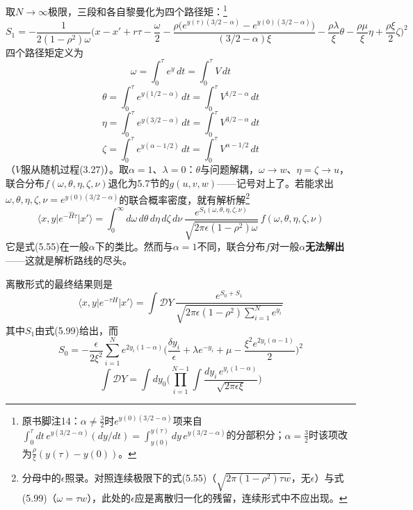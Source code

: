 取$N\to\infty$极限，三段和各自黎曼化为四个路径矩：\footnote{原书脚注14：$\alpha\neq\frac{3}{2}$时$e^{y(0)(3/2-\alpha)}$项来自$\int_0^{\tau}dt\,e^{y(3/2-\alpha)}(dy/dt)=\int_{y(0)}^{y(\tau)}dy\,e^{y(3/2-\alpha)}$的分部积分；$\alpha=\frac{3}{2}$时该项改为$\frac{\rho}{\xi}(y(\tau)-y(0))$。}
\begin{equation*}
S_{1}=-\frac{1}{2(1-\rho^{2})\omega}\biggl(x-x'+r\tau-\frac{\omega}{2}
-\frac{\rho\bigl(e^{y(\tau)(3/2-\alpha)}-e^{y(0)(3/2-\alpha)}\bigr)}{(3/2-\alpha)\xi}
-\frac{\rho\lambda}{\xi}\theta-\frac{\rho\mu}{\xi}\eta+\frac{\rho\xi}{2}\zeta\biggr)^{2}
\tag{5.99}
\end{equation*}四个路径矩定义为
\begin{equation*}
\omega=\int_{0}^{\tau}e^{y}\,dt=\int_{0}^{\tau}V\,dt
\tag{5.100}
\end{equation*}
\begin{equation*}
\theta=\int_{0}^{\tau}e^{y(1/2-\alpha)}\,dt=\int_{0}^{\tau}V^{1/2-\alpha}\,dt
\tag{5.101}
\end{equation*}
\begin{equation*}
\eta=\int_{0}^{\tau}e^{y(3/2-\alpha)}\,dt=\int_{0}^{\tau}V^{3/2-\alpha}\,dt
\tag{5.102}
\end{equation*}
\begin{equation*}
\zeta=\int_{0}^{\tau}e^{y(\alpha-1/2)}\,dt=\int_{0}^{\tau}V^{\alpha-1/2}\,dt
\tag{5.103}
\end{equation*}
（$V$服从随机过程(3.27)）。取$\alpha=1$、$\lambda=0$：$\theta$与问题解耦，$\omega\to w$、$\eta=\zeta\to u$，联合分布$f(\omega,\theta,\eta,\zeta,\nu)$退化为5.7节的$g(u,v,w)$——记号对上了。若能求出$\omega,\theta,\eta,\zeta,\nu=e^{y(0)(3/2-\alpha)}$的联合概率密度，就有解析解\footnote{分母中的$\epsilon$照录。对照连续极限下的式(5.55)（$\sqrt{2\pi(1-\rho^{2})\tau w}$，无$\epsilon$）与式(5.99)（$\omega=\tau w$），此处的$\epsilon$应是离散归一化的残留，连续形式中不应出现。}
\begin{equation*}
\langle x,y\vert e^{-\hat{H}\tau}\vert x'\rangle
=\int_{0}^{\infty}d\omega\,d\theta\,d\eta\,d\zeta\,d\nu\,
\frac{e^{S_1(\omega,\theta,\eta,\zeta,\nu)}}{\sqrt{2\pi\epsilon(1-\rho^{2})\omega}}\,
f(\omega,\theta,\eta,\zeta,\nu)
\tag{5.104}
\end{equation*}它是式(5.55)在一般$\alpha$下的类比。然而与$\alpha=1$不同，联合分布$f$对一般$\alpha$\textbf{无法解出}——这就是解析路线的尽头。

离散形式的最终结果则是
\begin{equation*}
\langle x,y\vert e^{-\tau H}\vert x'\rangle
=\int\mathcal{D}Y\,\frac{e^{S_0+S_1}}{\sqrt{2\pi\epsilon(1-\rho^{2})\sum_{i=1}^{N}e^{y_i}}}
\tag{5.105}
\end{equation*}
其中$S_1$由式(5.99)给出，而
\begin{equation*}
S_{0}=-\frac{\epsilon}{2\xi^{2}}\sum_{i=1}^{N}e^{2y_i(1-\alpha)}
\biggl(\frac{\delta y_i}{\epsilon}+\lambda e^{-y_i}+\mu-\frac{\xi^{2}e^{2y_i(\alpha-1)}}{2}\biggr)^{2}
\tag{5.106}
\end{equation*}
\begin{equation*}
\int\mathcal{D}Y=\int dy_0\biggl(\prod_{i=1}^{N-1}\int
\frac{dy_i\,e^{y_i(1-\alpha)}}{\sqrt{2\pi\epsilon\xi}}\biggr)
\tag{5.107}
\end{equation*}

